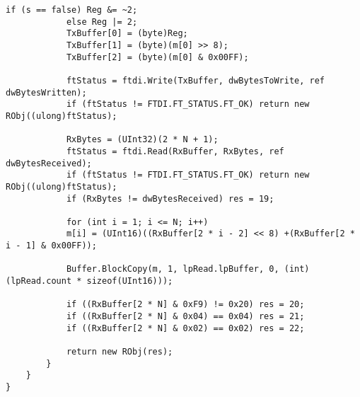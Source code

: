 \begin{lstlisting}[label=usb,caption=Основные функции взаимодействия с USB]
			if (s == false) Reg &= ~2;
			else Reg |= 2;
			TxBuffer[0] = (byte)Reg;
			TxBuffer[1] = (byte)(m[0] >> 8);
			TxBuffer[2] = (byte)(m[0] & 0x00FF);
			
			ftStatus = ftdi.Write(TxBuffer, dwBytesToWrite, ref dwBytesWritten);
			if (ftStatus != FTDI.FT_STATUS.FT_OK) return new RObj((ulong)ftStatus);
			
			RxBytes = (UInt32)(2 * N + 1);
			ftStatus = ftdi.Read(RxBuffer, RxBytes, ref dwBytesReceived);
			if (ftStatus != FTDI.FT_STATUS.FT_OK) return new RObj((ulong)ftStatus);
			if (RxBytes != dwBytesReceived) res = 19;   
			
			for (int i = 1; i <= N; i++)                
			m[i] = (UInt16)((RxBuffer[2 * i - 2] << 8) +(RxBuffer[2 * i - 1] & 0x00FF));
			
			Buffer.BlockCopy(m, 1, lpRead.lpBuffer, 0, (int)(lpRead.count * sizeof(UInt16)));
			
			if ((RxBuffer[2 * N] & 0xF9) != 0x20) res = 20; 
			if ((RxBuffer[2 * N] & 0x04) == 0x04) res = 21; 
			if ((RxBuffer[2 * N] & 0x02) == 0x02) res = 22; 
			
			return new RObj(res);
		}
	}
}
\end{lstlisting}